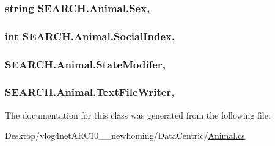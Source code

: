 \hypertarget{class_s_e_a_r_c_h_1_1_animal_a82057b36970fe4caf5df9f01cdec0c0b}{
\subsubsection[{Sex}]{\setlength{\rightskip}{0pt plus 5cm}string S\-E\-A\-R\-C\-H.\-Animal.\-Sex\hspace{0.3cm}{\ttfamily [get]}, {\ttfamily [set]}}}\label{class_s_e_a_r_c_h_1_1_animal_a82057b36970fe4caf5df9f01cdec0c0b}
\hypertarget{class_s_e_a_r_c_h_1_1_animal_a69680225461b7a1a5b4372cc9e6100e8}{
\subsubsection[{Social\-Index}]{\setlength{\rightskip}{0pt plus 5cm}int S\-E\-A\-R\-C\-H.\-Animal.\-Social\-Index\hspace{0.3cm}{\ttfamily [get]}, {\ttfamily [set]}}}\label{class_s_e_a_r_c_h_1_1_animal_a69680225461b7a1a5b4372cc9e6100e8}
\hypertarget{class_s_e_a_r_c_h_1_1_animal_acd1ded8fa372f9fce294354b95571b7e}{
\subsubsection[{State\-Modifer}]{ S\-E\-A\-R\-C\-H.\-Animal.\-State\-Modifer\hspace{0.3cm}{\ttfamily [get]}, {\ttfamily [set]}}}\label{class_s_e_a_r_c_h_1_1_animal_acd1ded8fa372f9fce294354b95571b7e}
\hypertarget{class_s_e_a_r_c_h_1_1_animal_a0e2be0558719e097f07a996ac36d810e}{
\subsubsection[{Text\-File\-Writer}]{ S\-E\-A\-R\-C\-H.\-Animal.\-Text\-File\-Writer\hspace{0.3cm}{\ttfamily [get]}, {\ttfamily [set]}}}\label{class_s_e_a_r_c_h_1_1_animal_a0e2be0558719e097f07a996ac36d810e}


The documentation for this class was generated from the following file\-:\begin{DoxyCompactItemize}
\item 
Desktop/vlog4net\-A\-R\-C10\-\_\-\_\-newhoming/\-Data\-Centric/\hyperlink{_animal_8cs}{Animal.\-cs}\end{DoxyCompactItemize}
